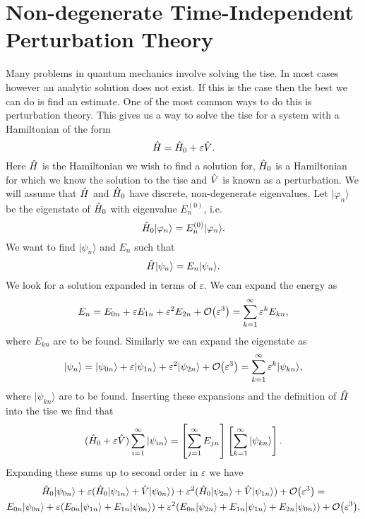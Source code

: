 \documentclass[a4paper]{article}
\renewcommand{\ket}[1]{\vert {#1} \rangle}
\theoremstyle{definition}
\begin{document}
    \section{Non-degenerate Time-Independent Perturbation Theory}
    Many problems in quantum mechanics involve solving the \gls{tise}.
    In most cases however an analytic solution does not exist.
    If this is the case then the best we can do is find an estimate.
    One of the most common ways to do this is perturbation theory.
    This gives us a way to solve the \gls{tise} for a system with a Hamiltonian of the form
    \[\hat{H} = \hat{H}_0 + \varepsilon\hat{V}.\]
    Here \(\hat{H}\) is the Hamiltonian we wish to find a solution for, \(\hat{H}_0\) is a Hamiltonian for which we know the solution to the \gls{tise} and \(\hat{V}\) is known as a perturbation.
    We will assume that \(\hat{H}\) and \(\hat{H}_0\) have discrete, non-degenerate eigenvalues.
    Let \(\ket{\varphi_n}\) be the eigenstate of \(\hat{H}_0\) with eigenvalue \(E_n^{(0)}\), i.e.
    \[\operator{H}_0\ket{\varphi_n} = E_n^{(0)}\ket{\varphi_n}.\]
    We want to find \(\ket{\psi_n}\) and \(E_n\) such that
    \[\operator{H}\ket{\psi_n} = E_n\ket{\psi_n}.\]
    We look for a solution expanded in terms of \(\varepsilon\).
    We can expand the energy as
    \[E_n = E_{0n} + \varepsilon E_{1n} + \varepsilon^2E_{2n} + \order{\varepsilon^3} = \sum_{k=1}^{\infty} \varepsilon^kE_{kn},\]
    where \(E_{kn}\) are to be found.
    Similarly we can expand the eigenstate as
    \[\ket{\psi_n} = \ket{\psi_{0n}} + \varepsilon\ket{\psi_{1n}} + \varepsilon^2\ket{\psi_{2n}} + \order{\varepsilon^3} = \sum_{k=1}^{\infty} \varepsilon^k\ket{\psi_{kn}},\]
    where \(\ket{\psi_{kn}}\) are to be found.
    Inserting these expansions and the definition of \(\hat{H}\) into the \gls{tise} we find that
    \[(\operator{H}_0 + \varepsilon\operator{V})\sum_{i=1}^{\infty}\ket{\psi_{in}} = \left[\sum_{j=1}^{\infty}E_{jn}\right]\left[\sum_{k=1}^{\infty}\ket{\psi_{kn}}\right].\]
    Expanding these sums up to second order in \(\varepsilon\) we have
    \begin{multline*}
        \operator{H}_0\ket{\psi_{0n}} + \varepsilon(\operator{H}_0\ket{\psi_{1n}} + \operator{V}\ket{\psi_{0n}}) + \varepsilon^2(\operator{H}_0\ket{\psi_{2n}} + \operator{V}\ket{\psi_{1n}}) + \order{\varepsilon^3} =\\
        E_{0n}\ket{\psi_{0n}} + \varepsilon(E_{0n}\ket{\psi_{1n}} + E_{1n}\ket{\psi_{0n}}) + \varepsilon^2(E_{0n}\ket{\psi_{2n}} + E_{1n}\ket{\psi_{1n}} + E_{2n}\ket{\psi_{0n}}) + \order{\varepsilon^3}.
    \end{multline*}
\end{document}
